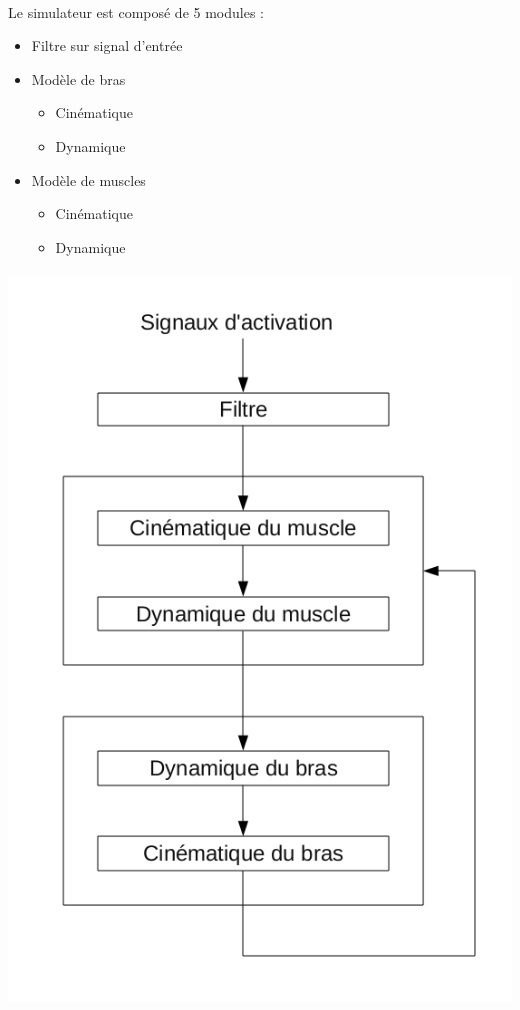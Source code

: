 \documentclass[pdftex,a4paper,11pt]{article}
\begin{document}
\paragraph{}
Le simulateur est composé de 5 modules :
\begin{itemize}
    \item Filtre sur signal d'entrée
    \item Modèle de bras
    \begin{itemize}
        \item Cinématique
        \item Dynamique
    \end{itemize}
    \item Modèle de muscles
    \begin{itemize}
        \item Cinématique
        \item Dynamique
    \end{itemize}
\end{itemize}

\paragraph{}
\begin{center}
        \includegraphics[width=.60\linewidth]{fig/modules}
\end{center}

\end{document}
